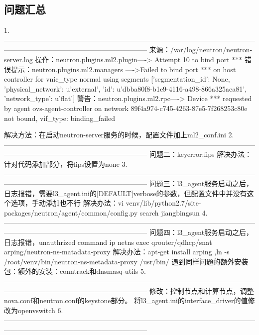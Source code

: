 \documentclass[a4paper,left=1.5cm,right=1.5cm,11pt]{article}
\begin{document}
\tableofcontents

\clearpage

\subsection{问题汇总}
1.--------------------------------------------------------------------------------------------------------------------------------------------------------------------------
	来源：/var/log/neutron/neutron-server.log
	操作：neutron.plugins.ml2.plugin----> Attempt 10 to bind port ***
	错误提示：neutron.plugins.ml2.managers ---->Failed to bind port *** on host controller for vnic_type normal using segments
	[{'segmentation_id': None, 'physical_network': u'external', 'id': u'dbba80f8-b1e9-4116-a498-866a325aea81', 'network_type': u'flat'}]
	警告：neutron.plugins.ml2.rpc----> Device *** requested by agent ovs-agent-controller on network 89f4a974-c745-4263-87e5-7f268253c80e not bound, vif_type: binding_failed

	解决方法：在启动neutron-server服务的时候，配置文件加上ml2_conf.ini
2.--------------------------------------------------------------------------------------------------------------------------------------------------------------------------
	问题二：keyerror:fips
	解决办法：针对代码添加部分，将fips设置为none
3.--------------------------------------------------------------------------------------------------------------------------------------------------------------------------
	问题三：l3_agent服务启动之后，日志报错，需要l3_agent.ini的[DEFAULT]verbose的参数，但配置文件中并没有这个选项，手动添加也不行
	解决办法：vi venv/lib/python2.7/site-packages/neutron/agent/common/config.py  search jiangbingsun
4.--------------------------------------------------------------------------------------------------------------------------------------------------------------------------
	问题四：l3_agent服务启动之后，日志报错，unauthrized command ip netns exec qrouter/qdhcp/snat arping/neutron-ns-matadata-proxy
	解决办法：apt-get install arping ,ln -s /root/venv/bin/neutron-ns-metadata-proxy /usr/bin/
	遇到同样问题的额外安装包：额外的安装：conntrack和dnsmasq-utils
5.--------------------------------------------------------------------------------------------------------------------------------------------------------------------------
	修改：控制节点和计算节点，调整nova.conf和neutron.conf的keystone部分。
	将l3_agent.ini的interface_driver的值修改为openvswitch
6.--------------------------------------------------------------------------------------------------------------------------------------------------------------------------
	
\end{document}
